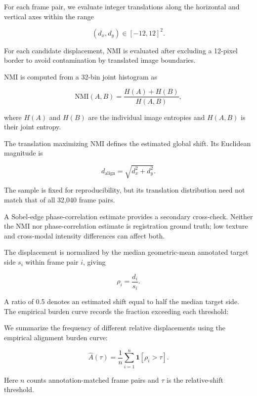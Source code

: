 \documentclass[10pt]{article}
\begin{document}
For each frame pair, we evaluate integer translations along the horizontal and vertical axes within the range

\begin{equation}
(d_x,d_y)\in[-12,12]^2.
\end{equation}

For each candidate displacement, NMI is evaluated after excluding a 12-pixel border to avoid contamination by translated image boundaries.

NMI is computed from a 32-bin joint histogram as

\begin{equation}
\mathrm{NMI}(A,B)
=
\frac{H(A)+H(B)}
{H(A,B)},
\end{equation}

where $H(A)$ and $H(B)$ are the individual image entropies and $H(A,B)$ is their joint entropy.

The translation maximizing NMI defines the estimated global shift. Its Euclidean magnitude is

\begin{equation}
d_{\mathrm{align}}
=
\sqrt{d_x^2+d_y^2}.
\end{equation}

The sample is fixed for reproducibility, but its translation distribution need not match that of all 32,040 frame pairs.

A Sobel-edge phase-correlation estimate provides a secondary cross-check. Neither the NMI nor phase-correlation estimate is registration ground truth; low texture and cross-modal intensity differences can affect both.

The displacement is normalized by the median geometric-mean annotated target side $s_i$ within frame pair $i$, giving

\begin{equation}
\rho_i=\frac{d_i}{s_i}.
\end{equation}

A ratio of 0.5 denotes an estimated shift equal to half the median target side. The empirical burden curve records the fraction exceeding each threshold:

We summarize the frequency of different relative displacements using the empirical alignment burden curve:

\begin{equation}
\widehat A(\tau)
=
\frac{1}{n}
\sum_{i=1}^{n}
\mathbf{1}[\rho_i>\tau].
\end{equation}

Here $n$ counts annotation-matched frame pairs and $\tau$ is the relative-shift threshold.
\end{document}
